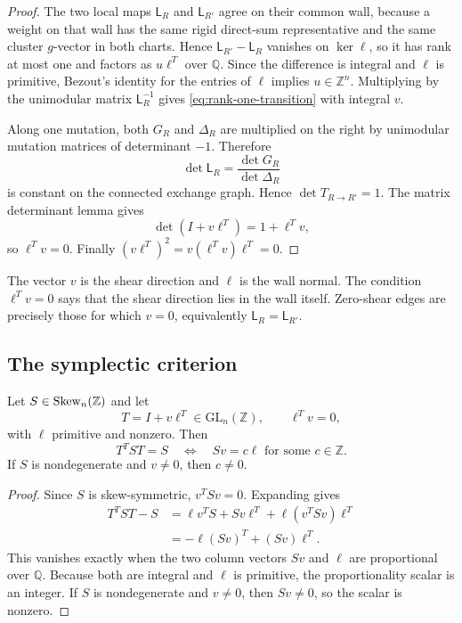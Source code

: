 \begin{proof}
The two local maps $\mathsf L_R$ and $\mathsf L_{R'}$ agree on their common
wall, because a weight on that wall has the same rigid direct-sum
representative and the same cluster $g$-vector in both charts.  Hence
$\mathsf L_{R'}-\mathsf L_R$ vanishes on $\ker\ell$, so it has rank at most
one and factors as $u\ell^T$ over $\mathbb Q$.  Since the difference is
integral and $\ell$ is primitive, Bezout's identity for the entries of
$\ell$ implies $u\in\mathbb Z^n$.  Multiplying by the unimodular matrix
$\mathsf L_R^{-1}$ gives \cref{eq:rank-one-transition} with integral $v$.

Along one mutation, both $G_R$ and $\Delta_R$ are multiplied on the right by
unimodular mutation matrices of determinant $-1$.  Therefore
\[
 \det\mathsf L_R=\frac{\det G_R}{\det\Delta_R}
\]
is constant on the connected exchange graph.  Hence
$\det T_{R\to R'}=1$.  The matrix determinant lemma gives
\[
 \det(I+v\ell^T)=1+\ell^Tv,
\]
so $\ell^Tv=0$.  Finally
$(v\ell^T)^2=v(\ell^Tv)\ell^T=0$.
\end{proof}

\begin{remark}
The vector $v$ is the shear direction and $\ell$ is the wall normal.  The
condition $\ell^Tv=0$ says that the shear direction lies in the wall itself.
Zero-shear edges are precisely those for which $v=0$, equivalently
$\mathsf L_R=\mathsf L_{R'}$.
\end{remark}

\subsection{The symplectic criterion}

\begin{theorem}
\label{thm:rank-one-symplectic}
Let $S\in\operatorname{Skew}_n(\mathbb Z)$ and let
\[
 T=I+v\ell^T\in\mathrm{GL}_n(\mathbb Z),
 \qquad \ell^Tv=0,
\]
with $\ell$ primitive and nonzero.  Then
\begin{equation}
 \boxed{
 T^TST=S
 \quad\Longleftrightarrow\quad
 Sv=c\ell\text{ for some }c\in\mathbb Z.}
 \label{eq:symplectic-transvection-criterion}
\end{equation}
If $S$ is nondegenerate and $v\ne0$, then $c\ne0$.
\end{theorem}

\begin{proof}
Since $S$ is skew-symmetric, $v^TSv=0$.  Expanding gives
\begin{align*}
 T^TST-S
 &=\ell v^TS+Sv\ell^T+\ell(v^TSv)\ell^T\\
 &=-\ell(Sv)^T+(Sv)\ell^T.
\end{align*}
This vanishes exactly when the two column vectors $Sv$ and $\ell$ are
proportional over $\mathbb Q$.  Because both are integral and $\ell$ is
primitive, the proportionality scalar is an integer.  If $S$ is
nondegenerate and $v\ne0$, then $Sv\ne0$, so the scalar is nonzero.
\end{proof}

